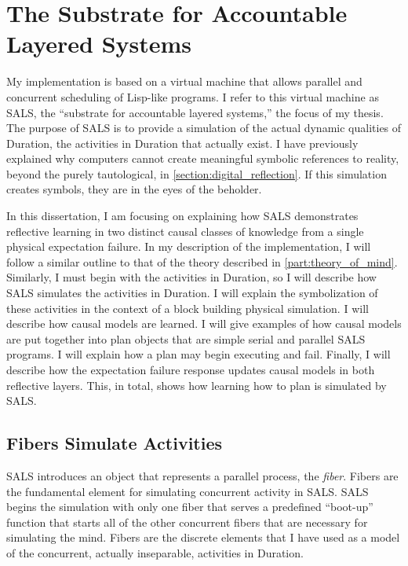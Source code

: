 \chapter{The Substrate for Accountable Layered Systems}
\label{chapter:the_substrate_for_accountable_layered_systems}

\newcommand{\SALS}{SALS}

My implementation is based on a virtual machine that allows parallel
and concurrent scheduling of Lisp-like programs.  I refer to this
virtual machine as {\SALS}, the ``substrate for accountable layered
systems,'' the focus of my thesis.  The purpose of {\SALS} is to
provide a simulation of the actual dynamic qualities of Duration, the
activities in Duration that actually exist.  I have previously
explained why computers cannot create meaningful symbolic references
to reality, beyond the purely tautological, in
\autoref{section:digital_reflection}.  If this simulation creates
symbols, they are in the eyes of the beholder.

In this dissertation, I am focusing on explaining how {\SALS}
demonstrates reflective learning in two distinct causal classes of
knowledge from a single physical expectation failure.  In my
description of the implementation, I will follow a similar outline to
that of the theory described in \autoref{part:theory_of_mind}.
Similarly, I must begin with the activities in Duration, so I will
describe how {\SALS} simulates the activities in Duration.  I will
explain the symbolization of these activities in the context of a
block building physical simulation.  I will describe how causal models
are learned.  I will give examples of how causal models are put
together into plan objects that are simple serial and parallel {\SALS}
programs.  I will explain how a plan may begin executing and fail.
Finally, I will describe how the expectation failure response updates
causal models in both reflective layers.  This, in total, shows how
learning how to plan is simulated by {\SALS}.

\section{Fibers Simulate Activities}

{\SALS} introduces an object that represents a parallel process, the
\emph{fiber}.  Fibers are the fundamental element for simulating
concurrent activity in {\SALS}.  {\SALS} begins the simulation with only
one fiber that serves a predefined ``boot-up'' function that starts
all of the other concurrent fibers that are necessary for simulating
the mind.  Fibers are the discrete elements that I have used as a
model of the concurrent, actually inseparable, activities in Duration.

